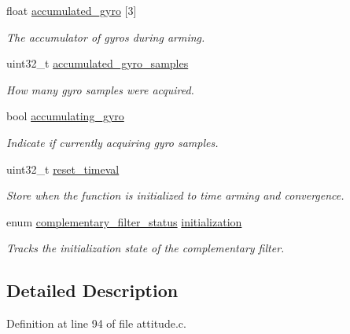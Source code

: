 \begin{DoxyCompactItemize}
float \hyperlink{structcomplementary__filter__state_ada568dc8edca423fd6744e58049272e9}{accumulated\-\_\-gyro} \mbox{[}3\mbox{]}
\begin{DoxyCompactList}\small\item\em \-The accumulator of gyros during arming. \end{DoxyCompactList}\item 
uint32\-\_\-t \hyperlink{structcomplementary__filter__state_ae32da25bd01d785b59379dea487222dc}{accumulated\-\_\-gyro\-\_\-samples}
\begin{DoxyCompactList}\small\item\em \-How many gyro samples were acquired. \end{DoxyCompactList}\item 
bool \hyperlink{structcomplementary__filter__state_a0a5740a2b1f2c69d56ee1c5d4ace3d20}{accumulating\-\_\-gyro}
\begin{DoxyCompactList}\small\item\em \-Indicate if currently acquiring gyro samples. \end{DoxyCompactList}\item 
uint32\-\_\-t \hyperlink{structcomplementary__filter__state_a5b8422bb68fa412d1ff92c82331c18ec}{reset\-\_\-timeval}
\begin{DoxyCompactList}\small\item\em \-Store when the function is initialized to time arming and convergence. \end{DoxyCompactList}\item 
enum \hyperlink{group___attitude_module_ga2a3dfab57b52ff023f9197d9afe06ff4}{complementary\-\_\-filter\-\_\-status} \hyperlink{structcomplementary__filter__state_a28dd748e22efb34aa6dddf4873b1c445}{initialization}
\begin{DoxyCompactList}\small\item\em \-Tracks the initialization state of the complementary filter. \end{DoxyCompactList}\end{DoxyCompactItemize}


\subsection{\-Detailed \-Description}


\-Definition at line 94 of file attitude.\-c.



